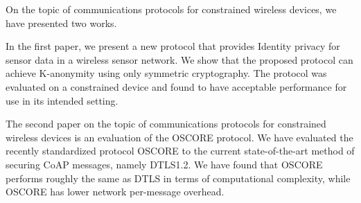 On the topic of communications protocols for constrained wireless devices, we have presented two works.

In the first paper, we present a new protocol that provides Identity privacy for sensor data in a wireless sensor network. We show that the proposed protocol can achieve K-anonymity using only symmetric cryptography. The protocol was evaluated on a constrained device and found to have acceptable performance for use in its intended setting.

The second paper on the topic of communications protocols for constrained wireless devices is an evaluation of the OSCORE protocol. We have evaluated the recently standardized protocol OSCORE to the current state-of-the-art method of securing CoAP messages, namely DTLS1.2. We have found that OSCORE performs roughly the same as DTLS in terms of computational complexity, while OSCORE has lower network per-message overhead. 


\label{sec:kappa-conclusions}
{ \raggedright
\printbibliography[segment=\therefsegment,heading=bibintoc]
}
